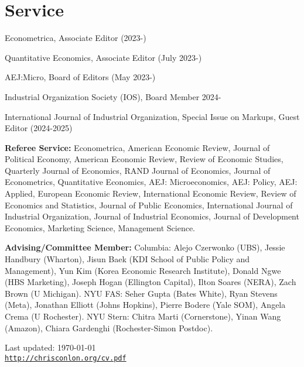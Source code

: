 \documentclass[letterpaper]{article}
\def\footerlink{http://chrisconlon.org/cv.pdf}
\renewenvironment{itemize}{
  \begin{list}{}{
    \setlength{\leftmargin}{1.5em}
  }
}{
  \end{list}
}
\begin{document}
\section*{Service}
\begin{itemize}
\item Econometrica, Associate Editor (2023-)
\item Quantitative Economics,  Associate Editor (July 2023-)
\item AEJ:Micro, Board of Editors (May 2023-)
\item Industrial Organization Society (IOS), Board Member 2024-
\item International Journal of Industrial Organization, Special Issue on Markups, Guest Editor (2024-2025)
\item \textbf{Referee Service:} Econometrica, American Economic Review, Journal of Political Economy, American Economic Review, Review of Economic Studies, Quarterly Journal of Economics, RAND Journal of Economics, Journal of Econometrics, Quantitative Economics, AEJ: Microeconomics, AEJ: Policy, AEJ: Applied, European Economic Review, International Economic Review, Review of Economics and Statistics, Journal of Public Economics, International Journal of Industrial Organization, Journal of Industrial Economics, Journal of Development Economics, Marketing Science, Management Science.
\item \textbf{Advising/Committee Member:}  Columbia: Alejo Czerwonko (UBS), Jessie Handbury (Wharton), Jisun Baek (KDI School of Public Policy and Management), Yun Kim (Korea Economic Research Institute), Donald Ngwe (HBS Marketing), Joseph Hogan (Ellington Capital), Ilton Soares (NERA), Zach Brown (U Michigan). NYU FAS: Seher Gupta (Bates White), Ryan Stevens (Meta), Jonathan Elliott (Johns Hopkins), Pierre Bodere (Yale SOM), Angela Crema (U Rochester). NYU Stern: Chitra Marti (Cornerstone), Yinan Wang (Amazon), Chiara Gardenghi (Rochester-Simon Postdoc).
\end{itemize}
\bigskip

\begin{center}
  \begin{footnotesize}
    Last updated: \today \\
    \href{\footerlink}{\texttt{\footerlink}}
  \end{footnotesize}
\end{center}
\end{document}
